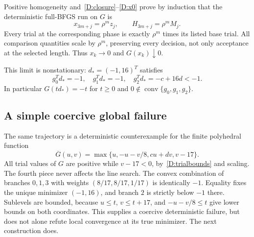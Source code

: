 \documentclass[10pt,oneside,openany]{book}
\theoremstyle{remark}\newtheorem{remark}{Remark}[chapter]
\begin{document}
Positive homogeneity and~\eqref{D:closure}--\eqref{D:x0} prove by induction that the deterministic full-BFGS run on $G$ is
\[
 x_{3m+j}=\rho^m z_j,\qquad H_{3m+j}=\rho^m M_j.
\]
Every trial at the corresponding phase is exactly $\rho^m$ times its listed base trial. All comparison quantities scale by $\rho^m$, preserving every decision, not only acceptance at the selected length. Thus $x_k\to0$ and $G(x_k)\downarrow0$.

This limit is nonstationary: $d_* =(-1,16)^T$ satisfies
\[
 g_0^Td_*=-1,\quad g_1^Td_*=-1,\quad g_2^Td_*=-c+16d<-1.
\]
In particular $G(td_*)=-t$ for $t\ge0$ and $0\notin\operatorname{conv}\{g_0,g_1,g_2\}$.

\subsection{A simple coercive global failure}
The same trajectory is a deterministic counterexample for the finite polyhedral function
\[
 \overline G(u,v)=\max\{u,-u-v/8,cu+dv,v-17\}.
\]
All trial values of $G$ are positive while $v-17<0$, by~\eqref{D:trialbounds} and scaling. The fourth piece never affects the line search. The convex combination of branches $0,1,3$ with weights $(8/17,8/17,1/17)$ is identically $-1$. Equality fixes the unique minimizer $(-1,16)$, and branch $2$ is strictly below $-1$ there. Sublevels are bounded, because $u\le t$, $v\le t+17$, and $-u-v/8\le t$ give lower bounds on both coordinates. This supplies a coercive deterministic failure, but does not alone refute local convergence at its true minimizer. The next construction does.


\setcounter{section}{3}
\setcounter{theorem}{1}
\setcounter{lemma}{1}
\setcounter{corollary}{0}
\setcounter{proposition}{0}
\setcounter{remark}{0}
\setcounter{equation}{7}
\end{document}
